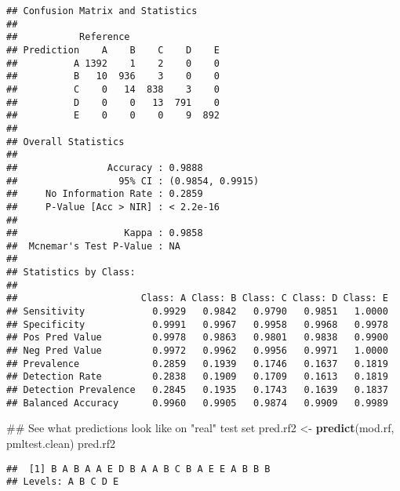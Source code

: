\documentclass[]{article}
\newenvironment{Shaded}{\begin{snugshade}}{\end{snugshade}}
\newcommand{\KeywordTok}[1]{\textcolor[rgb]{0.13,0.29,0.53}{\textbf{{#1}}}}
\newcommand{\StringTok}[1]{\textcolor[rgb]{0.31,0.60,0.02}{{#1}}}
\newcommand{\NormalTok}[1]{{#1}}
\begin{document}
\begin{Shaded}
\end{Shaded}

\begin{verbatim}
## Confusion Matrix and Statistics
## 
##           Reference
## Prediction    A    B    C    D    E
##          A 1392    1    2    0    0
##          B   10  936    3    0    0
##          C    0   14  838    3    0
##          D    0    0   13  791    0
##          E    0    0    0    9  892
## 
## Overall Statistics
##                                           
##                Accuracy : 0.9888          
##                  95% CI : (0.9854, 0.9915)
##     No Information Rate : 0.2859          
##     P-Value [Acc > NIR] : < 2.2e-16       
##                                           
##                   Kappa : 0.9858          
##  Mcnemar's Test P-Value : NA              
## 
## Statistics by Class:
## 
##                      Class: A Class: B Class: C Class: D Class: E
## Sensitivity            0.9929   0.9842   0.9790   0.9851   1.0000
## Specificity            0.9991   0.9967   0.9958   0.9968   0.9978
## Pos Pred Value         0.9978   0.9863   0.9801   0.9838   0.9900
## Neg Pred Value         0.9972   0.9962   0.9956   0.9971   1.0000
## Prevalence             0.2859   0.1939   0.1746   0.1637   0.1819
## Detection Rate         0.2838   0.1909   0.1709   0.1613   0.1819
## Detection Prevalence   0.2845   0.1935   0.1743   0.1639   0.1837
## Balanced Accuracy      0.9960   0.9905   0.9874   0.9909   0.9989
\end{verbatim}

\begin{Shaded}
\begin{Highlighting}[]
\NormalTok{## See what predictions look like on "real" test set}
\NormalTok{pred.rf2 <-}\StringTok{ }\KeywordTok{predict}\NormalTok{(mod.rf, pmltest.clean)}
\NormalTok{pred.rf2}
\end{Highlighting}
\end{Shaded}

\begin{verbatim}
##  [1] B A B A A E D B A A B C B A E E A B B B
## Levels: A B C D E
\end{verbatim}
\end{document}
